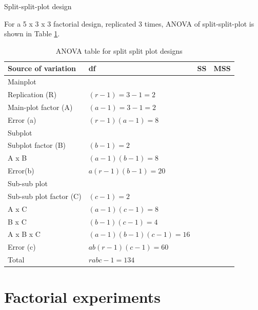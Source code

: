 \documentclass[
  ignorenonframetext,
  aspectratio=169]{beamer}
\begin{document}
\begin{frame}{Split-split-plot design}
\protect\hypertarget{split-split-plot-design}{}
\small

For a 5 x 3 x 3 factorial design, replicated 3 times, ANOVA of
split-split-plot is shown in Table \ref{tab:anova-split-split-plot}.

\begingroup\fontsize{7}{9}\selectfont

\begin{longtable}[t]{llll}
\caption{\label{tab:anova-split-split-plot}ANOVA table for split split plot designs}\\
\toprule
Source of variation & df & SS & MSS\\
\midrule
Mainplot &  &  & \\
\hspace{1em}Replication (R) & $(r-1) = 3-1 = 2$ &  & \\
\hspace{1em}Main-plot factor (A) & $(a-1) = 3-1 = 2$ &  & \\
\hspace{1em}Error (a) & $(r-1)(a-1) = 8$ &  & \\
Subplot &  &  & \\
\hspace{1em}Subplot factor (B) & $(b-1) = 2$ &  & \\
\hspace{1em}A x B & $(a-1)(b-1) = 8$ &  & \\
\hspace{1em}Error(b) & $a(r-1)(b-1) = 20$ &  & \\
Sub-sub plot &  &  & \\
\hspace{1em}Sub-sub plot factor (C) & $(c-1) = 2$ &  & \\
\hspace{1em}A x C & $(a-1)(c-1) = 8$ &  & \\
\hspace{1em}B x C & $(b-1)(c-1) = 4$ &  & \\
\hspace{1em}A x B x C & $(a-1)(b-1)(c-1) = 16$ &  & \\
\hspace{1em}Error (c) & $ab(r-1)(c-1) = 60$ &  & \\
Total & $rabc-1 = 134$ &  & \\
\bottomrule
\end{longtable}
\endgroup{}
\end{frame}

\hypertarget{factorial-experiments}{%
\section{Factorial experiments}\label{factorial-experiments}}
\end{document}
